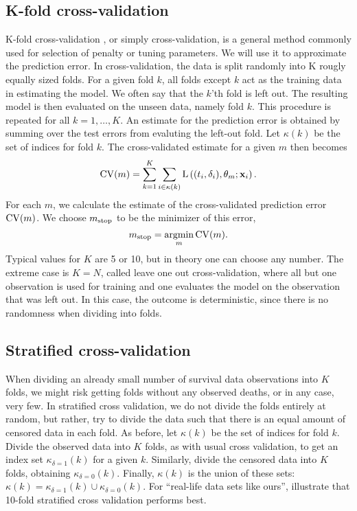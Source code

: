 \subsection{K-fold cross-validation}
K-fold cross-validation \citep{lachenbruch}, or simply cross-validation, is a general method commonly used for selection of penalty or tuning parameters. We will use it to approximate the prediction error. In cross-validation, the data is split randomly into K rougly equally sized folds. For a given fold $k$, all folds except $k$ act as the training data in estimating the model. We often say that the $k$'th fold is left out. The resulting model is then evaluated on the unseen data, namely fold $k$. This procedure is repeated for all $k=1,\ldots,K$. An estimate for the prediction error is obtained by summing over the test errors from evaluting the left-out fold. Let $\kappa(k)$ be the set of indices for fold $k$. The cross-validated estimate for a given $m$ then becomes
\begin{equation}
    \operatorname{CV}(m)=\sum_{k=1}^K\sum_{i\in\kappa(k)}\operatorname{L}\left((t_i,\delta_i),\theta_m;\mathbf{x}_i\right).
\end{equation}
For each $m$, we calculate the estimate of the cross-validated prediction error $\operatorname{CV}(m)$. We choose $m_{\text{stop}}$ to be the minimizer of this error,
\begin{equation}
    m_{\text{stop}}=\operatorname*{argmin}_{m}\operatorname{CV}(m).
\end{equation}
Typical values for $K$ are 5 or 10, but in theory one can choose any number. The extreme case is $K=N$, called leave one out cross-validation, where all but one observation is used for training and one evaluates the model on the observation that was left out. In this case, the outcome is deterministic, since there is no randomness when dividing into folds.

\subsection{Stratified cross-validation}
When dividing an already small number of survival data observations into $K$ folds, we might risk getting folds without any observed deaths, or in any case, very few. In stratified cross validation, we do not divide the folds entirely at random, but rather, try to divide the data such that there is an equal amount of censored data in each fold.
As before, let $\kappa(k)$ be the set of indices for fold $k$. Divide the observed data into $K$ folds, as with usual cross validation, to get an index set $\kappa_{\delta=1}(k)$ for a given $k$. Similarly, divide the censored data into $K$ folds, obtaining $\kappa_{\delta=0}(k)$. Finally, $\kappa(k)$ is the union of these sets: $\kappa(k)=\kappa_{\delta=1}(k)\cup\kappa_{\delta=0}(k)$. For ``real-life data sets like ours'', \cite{kohavi} illustrate that 10-fold stratified cross validation performs best.

